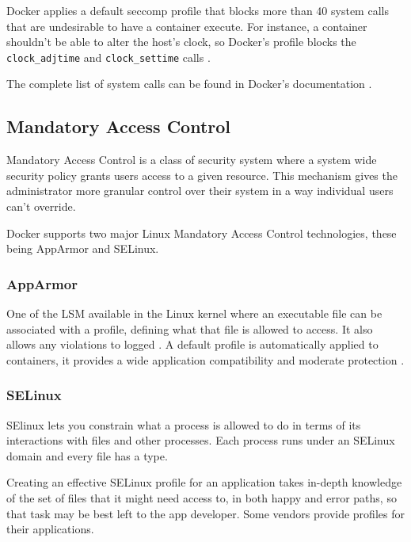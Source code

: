 Docker applies a default seccomp profile that blocks more than 40 system calls that are undesirable to have a container execute. For instance, a container shouldn't be able to alter the host's clock, so Docker's profile blocks the \texttt{clock\_adjtime} and \texttt{clock\_settime} calls \cite{Rice2020-kl}.

The complete list of system calls can be found in Docker's documentation \cite{docker-seccomp}.


\subsection{Mandatory Access Control}
\label{ssec::security:sel-apparm}

Mandatory Access Control is a class of security system where a system wide security policy grants users access to a given resource. This mechanism gives the administrator more granular control over their system in a way individual users can't override.

Docker supports two major Linux Mandatory Access Control technologies, these being AppArmor and SELinux.

\subsubsection{\textbf{AppArmor}}

One of the \ac{LSM} available in the Linux kernel where an executable file can be associated with a profile, defining what that file is allowed to access. It also allows any violations to logged \cite{ubuntu-apparmor}. A default profile is automatically applied to containers, it provides a wide application compatibility and moderate protection \cite{docker-apparmor}.

\subsubsection{\textbf{SELinux}}
SElinux lets you constrain what a process is allowed to do in terms of its interactions with files and other processes. Each process runs under an SELinux domain and every file has a type.

Creating an effective SELinux profile for an application takes in-depth knowledge of the set of files that it might need access to, in both happy and error paths, so that task may be best left to the app developer. Some vendors provide profiles for their applications.

